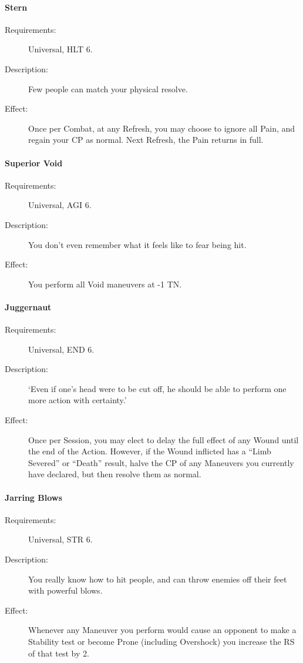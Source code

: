 \documentclass[oneside,11pt,english]{book}
\begin{document}
\paragraph{\label{talent:Stern}Stern}
\begin{description}
	\item [Requirements:] Universal, HLT 6. 
	\item [Description:] Few people can match your physical resolve. 
	\item [Effect:] Once per Combat, at any Refresh, you may choose to ignore all Pain, and regain your CP as normal. Next Refresh, the Pain returns in full. 
	
\end{description}
\paragraph{\label{talent:Superior Void}Superior Void}
\begin{description}
	\item [Requirements:] Universal, AGI 6. 
	\item [Description:] You don’t even remember what it feels like to fear being hit. 
	\item [Effect:] You perform all Void maneuvers at -1 TN. 
	
\end{description}
\paragraph{\label{talent:Juggernaut}Juggernaut}
\begin{description}
	\item [Requirements:] Universal, END 6. 
	\item [Description:] ‘Even if one’s head were to be cut off, he should be able to perform one more action with certainty.’ 
	\item [Effect:] Once per Session, you may elect to delay the full effect of any Wound until the end of the Action. 
	However, if the Wound inflicted has a “Limb Severed” or “Death” result, halve the CP of any Maneuvers 
	you currently have declared, but then resolve them as normal. 
	
\end{description}
\paragraph{\label{talent:Jarring Blows}Jarring Blows}
\begin{description}
	\item [Requirements:] Universal, STR 6. 
	\item [Description:] You really know how to hit people, and can throw enemies off their feet with powerful blows. 
	\item [Effect:] Whenever any Maneuver you perform would cause an opponent to make a Stability test or become Prone (including Overshock) you increase the RS of that test by 2. 
	
\end{description}
\end{document}
